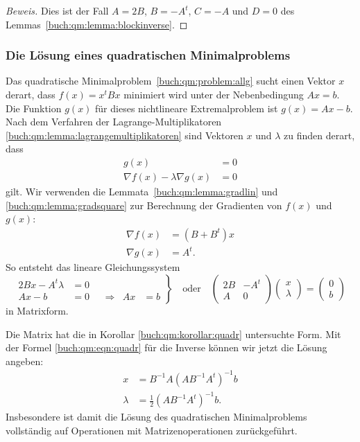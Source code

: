 \begin{proof}[Beweis]
Dies ist der Fall $A=2B$, $B=-A^t$, $C=-A$ und $D=0$ des
Lemmas~\ref{buch:qm:lemma:blockinverse}.
\end{proof}

%
%
\subsubsection{Die Lösung eines quadratischen Minimalproblems}
Das quadratische Minimalproblem~\ref{buch:qm:problem:allg} sucht
einen Vektor $x$ derart, dass $f(x)=x^tBx$ minimiert wird unter der
Nebenbedingung $Ax=b$.
Die Funktion $g(x)$ für dieses nichtlineare Extremalproblem ist
$g(x)=Ax-b$.
Nach dem Verfahren der Lagrange-Multiplikatoren
\ref{buch:qm:lemma:lagrangemultiplikatoren}
sind Vektoren $x$ und $\lambda$ zu finden derart, dass
\begin{align*}
g(x) &= 0
\\
\nabla f(x) -\lambda \nabla g(x) &=0
\end{align*}
gilt.
Wir verwenden die Lemmata~\ref{buch:qm:lemma:gradlin}
und \ref{buch:qm:lemma:gradsquare}
zur Berechnung der Gradienten von $f(x)$ und $g(x)$:
\begin{align*}
\nabla f(x) &= (B+B^t)x
\\
\nabla g(x) &= A^t.
\end{align*}
So entsteht das lineare Gleichungssystem
\[
\left.
\begin{aligned}
2Bx - A^t\lambda &=0
\\
Ax-b&=0 &&\Rightarrow& Ax&=b
\end{aligned}
\right\}
\quad\text{oder}\quad
\begin{pmatrix}
2B & -A^t \\
 A & 0
\end{pmatrix}
\begin{pmatrix}x\\\lambda\end{pmatrix}
=
\begin{pmatrix}0\\ b\end{pmatrix}
\]
in Matrixform.

Die Matrix hat die in Korollar
\ref{buch:qm:korollar:quadr} untersuchte Form.
Mit der Formel \eqref{buch:qm:eqn:quadr} für die Inverse können wir jetzt 
die Lösung angeben:
\begin{align*}
x       &= B^{-1}A(AB^{-1}A^t)^{-1} b \\
\lambda &= \frac12(AB^{-1}A^t)^{-1}b.
\end{align*}
Insbesondere ist damit die Lösung des quadratischen Minimalproblems
vollständig auf Operationen mit Matrizenoperationen zurückgeführt.

